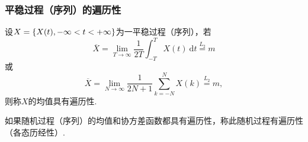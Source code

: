 \begin{frame}
    \frametitle{平稳过程（序列）的遍历性}
    \begin{mydefinition}[均值遍历性]
        设$X=\left\{X(t),-\infty<t<+\infty\right\}$为一平稳过程（序列），若
        \begin{equation*}
            \overline X=\lim_{T\to\infty}\frac1{2T}\int_{-T}^{T}X(t)\ \mathrm dt\overset{L_2}{=}m
        \end{equation*}
        或
        \begin{equation*}
            \overline X=\lim_{N\to\infty}\frac1{2N+1}\sum_{k=-N}^NX(k)\overset{L_2}{=}m,
        \end{equation*}
        则称$X$的均值具有遍历性\footnotemark . 
    \end{mydefinition}
    如果随机过程（序列）的均值和协方差函数都具有遍历性，称此随机过程有遍历性（各态历经性）. 
\end{frame}

\setcounter{footnote}{0}

